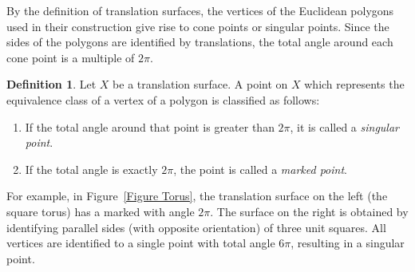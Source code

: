 \documentclass[11pt]{amsart}
\theoremstyle{plain}
\theoremstyle{definition}
\newtheorem{definition}[theorem]{Definition}
\theoremstyle{remark}
\numberwithin{equation}{section}
\numberwithin{figure}{section}
\begin{document}
By the definition of translation surfaces, the vertices of the Euclidean polygons used in their construction give rise to cone points or singular points. Since the sides of the polygons are identified by translations, the total angle around each cone point is a multiple of $2\pi$.

\begin{definition}
Let $X$ be a translation surface. A point on $X$ which represents the equivalence class of a vertex of a polygon is classified as follows:
\begin{enumerate}
    \item If the total angle around that point is greater than $2\pi$, it is called a \emph{singular point}.
    \item If the total angle is exactly $2\pi$, the point is called a \emph{marked point}.
\end{enumerate}
\end{definition}

For example, in Figure~\ref{Figure Torus}, the translation surface on the left (the square torus) has a marked with angle $2\pi$. The surface on the right is obtained by identifying parallel sides (with opposite orientation) of three unit squares. All vertices are identified to a single point with total angle $6\pi$, resulting in a singular point.
\end{document}
